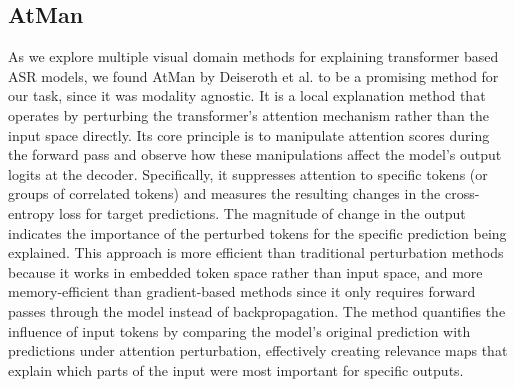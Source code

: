 \documentclass[../report.tex]{subfiles}
\begin{document}
    \subsection{AtMan}
    As we explore multiple visual domain methods for explaining transformer based ASR models, we found AtMan by Deiseroth et al. \cite{NEURIPS2023_c83bc020} to be a promising method for our task, since it was modality agnostic. 
    It is a local explanation method that operates by perturbing the transformer's attention mechanism rather than the input space directly. Its core principle is to manipulate attention scores during the forward pass and observe how these manipulations affect the model's output logits at the decoder. Specifically, it suppresses attention to specific tokens (or groups of correlated tokens) and measures the resulting changes in the cross-entropy loss for target predictions. The magnitude of change in the output indicates the importance of the perturbed tokens for the specific prediction being explained. This approach is more efficient than traditional perturbation methods because it works in embedded token space rather than input space, and more memory-efficient than gradient-based methods since it only requires forward passes through the model instead of backpropagation. The method quantifies the influence of input tokens by comparing the model's original prediction with predictions under attention perturbation, effectively creating relevance maps that explain which parts of the input were most important for specific outputs.
    
\end{document}
